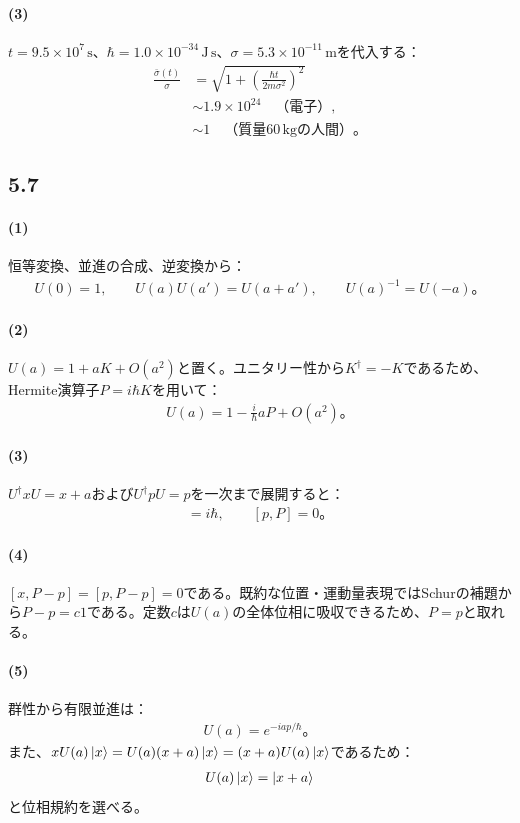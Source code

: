 \documentclass[platex,dvipdfmx,a4paper]{jsarticle}
\begin{document}
\paragraph{(3)} $t=9.5\times10^7\,\mathrm{s}$、$\hbar=1.0\times10^{-34}\,\mathrm{J\,s}$、$\sigma=5.3\times10^{-11}\,\mathrm m$を代入する：
\begin{align*}
 \frac{\bar\sigma(t)}\sigma
 &=\sqrt{1+\left(\frac{\hbar t}{2m\sigma^2}\right)^2}\\
 &\sim1.9\times10^{24}\quad\text{（電子）},\\
 &\sim1\quad\text{（質量$60\,\mathrm{kg}$の人間）}。
\end{align*}
\subsection*{5.7}
\paragraph{(1)} 恒等変換、並進の合成、逆変換から：
\begin{align*}
 U(0)=1,
 \qquad U(a)U(a')=U(a+a'),
 \qquad U(a)^{-1}=U(-a)。
\end{align*}
\paragraph{(2)} $U(a)=1+aK+O(a^2)$と置く。ユニタリー性から$K^\dagger=-K$であるため、Hermite演算子$P=i\hbar K$を用いて：
\begin{align*}
 U(a)=1-\frac{i}{\hbar}aP+O(a^2)。
\end{align*}
\paragraph{(3)} $U^\dagger xU=x+a$および$U^\dagger pU=p$を一次まで展開すると：
\begin{align*}
 [x,P]=i\hbar,\qquad[p,P]=0。
\end{align*}
\paragraph{(4)} $[x,P-p]=[p,P-p]=0$である。既約な位置・運動量表現ではSchurの補題から$P-p=c1$である。定数$c$は$U(a)$の全体位相に吸収できるため、$P=p$と取れる。
\paragraph{(5)} 群性から有限並進は：
\begin{align*}
 U(a)=e^{-iap/\hbar}。
\end{align*}
また、$xU(a)\ket x=U(a)(x+a)\ket x=(x+a)U(a)\ket x$であるため：
\begin{align*}
 U(a)\ket x=\ket{x+a}
\end{align*}
と位相規約を選べる。
\end{document}
